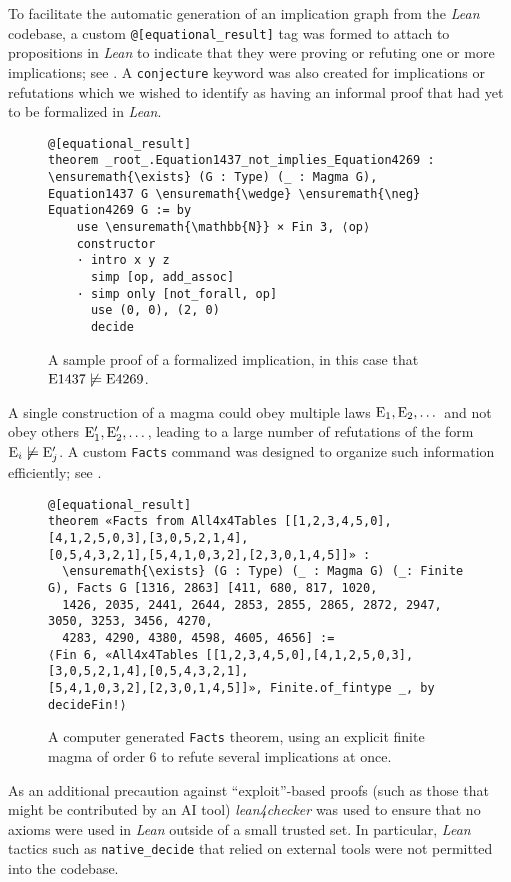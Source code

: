 To facilitate the automatic generation of an implication graph from the \emph{Lean} codebase, a custom \texttt{@{[}equational\_result{]}} tag was formed to attach to  propositions in \emph{Lean} to indicate that they were proving or refuting one or more implications; see .  A \texttt{conjecture} keyword was also created for implications or refutations which we wished to identify as having an informal proof that had yet to be formalized in \emph{Lean}.

\begin{figure}
\centering
\begin{Verbatim}
@[equational_result]
theorem _root_.Equation1437_not_implies_Equation4269 : \ensuremath{\exists} (G : Type) (_ : Magma G),
Equation1437 G \ensuremath{\wedge} \ensuremath{\neg} Equation4269 G := by
    use \ensuremath{\mathbb{N}} × Fin 3, ⟨op⟩
    constructor
    · intro x y z
      simp [op, add_assoc]
    · simp only [not_forall, op]
      use (0, 0), (2, 0)
      decide
\end{Verbatim}
\caption{A sample proof of a formalized implication, in this case that $\mathrm{E}1437 \not\models \mathrm{E}4269$.}
\label{fig:impl}
\end{figure}

A single construction of a magma could obey multiple laws $\mathrm{E}_1,\mathrm{E}_2,\dots$ and not obey others $\mathrm{E}'_1, \mathrm{E}'_2, \dots$, leading to a large number of refutations of the form $\mathrm{E}_i \not\models \mathrm{E}'_j$.  A custom \texttt{Facts} command was designed to organize such information efficiently; see .

\begin{figure}
\centering
\begin{Verbatim}
@[equational_result]
theorem «Facts from All4x4Tables [[1,2,3,4,5,0],[4,1,2,5,0,3],[3,0,5,2,1,4],
[0,5,4,3,2,1],[5,4,1,0,3,2],[2,3,0,1,4,5]]» :
  \ensuremath{\exists} (G : Type) (_ : Magma G) (_: Finite G), Facts G [1316, 2863] [411, 680, 817, 1020,
  1426, 2035, 2441, 2644, 2853, 2855, 2865, 2872, 2947, 3050, 3253, 3456, 4270,
  4283, 4290, 4380, 4598, 4605, 4656] :=
⟨Fin 6, «All4x4Tables [[1,2,3,4,5,0],[4,1,2,5,0,3],[3,0,5,2,1,4],[0,5,4,3,2,1],
[5,4,1,0,3,2],[2,3,0,1,4,5]]», Finite.of_fintype _, by decideFin!⟩
\end{Verbatim}
\caption{A computer generated \texttt{Facts} theorem, using an explicit finite magma of order $6$ to refute several implications at once.}
\label{fig:facts}
\end{figure}

As an additional precaution against ``exploit''-based proofs (such as those that might be contributed by an AI tool) \emph{lean4checker} was used to ensure that no axioms were used in \emph{Lean} outside of a small trusted set.  In particular, \emph{Lean} tactics such as \texttt{native\_decide} that relied on external tools were not permitted into the codebase.

